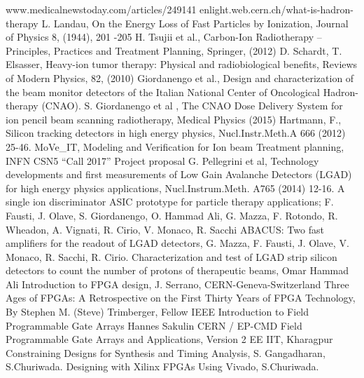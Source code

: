 \pagestyle{plain}
\begin{thebibliography}{00}	
	www.medicalnewstoday.com/articles/249141
	enlight.web.cern.ch/what-is-hadron-therapy
	L. Landau, On the Energy Loss of Fast Particles by Ionization, Journal of Physics 8, (1944), 201 -205
	H. Tsujii et al., Carbon-Ion Radiotherapy – Principles, Practices and Treatment Planning, Springer, (2012)
	D. Schardt, T. Elsasser, Heavy-ion tumor therapy: Physical and radiobiological benefits, Reviews of Modern Physics, 82, (2010)
	Giordanengo et al., Design and characterization of the beam monitor detectors of the Italian National Center of Oncological Hadron-therapy (CNAO).
	S. Giordanengo et al , The CNAO Dose Delivery System for ion pencil beam scanning radiotherapy, Medical Physics (2015)
	Hartmann, F., Silicon tracking detectors in high energy physics, Nucl.Instr.Meth.A 666 (2012) 25-46.
	MoVe\_IT, Modeling and Verification for Ion beam Treatment planning, INFN CSN5 “Call 2017” Project proposal
	G. Pellegrini et al, Technology developments and first measurements of Low Gain Avalanche Detectors (LGAD) for high energy physics applications, Nucl.Instrum.Meth. A765 (2014) 12-16.
	A single ion discriminator ASIC prototype for particle therapy applications; F. Fausti, J. Olave, S. Giordanengo, O. Hammad Ali, G. Mazza, F. Rotondo, R. Wheadon, A. Vignati, R. Cirio, V. Monaco, R. Sacchi
	ABACUS: Two fast amplifiers for the readout of LGAD detectors, G. Mazza, F. Fausti, J. Olave, V. Monaco, R. Sacchi, R. Cirio.
	Characterization and test of LGAD strip silicon detectors to count the number of protons of therapeutic beams, Omar Hammad Ali
	Introduction to FPGA design, J. Serrano, CERN-Geneva-Switzerland
	Three Ages of FPGAs: A Retrospective on the First Thirty Years of FPGA Technology, By Stephen M. (Steve) Trimberger, Fellow IEEE
	Introduction to Field Programmable Gate Arrays Hannes Sakulin CERN / EP-CMD
	Field Programmable Gate Arrays and Applications, Version 2 EE IIT, Kharagpur
	Constraining Designs for Synthesis and Timing Analysis, S. Gangadharan, S.Churiwada.
	Designing with Xilinx FPGAs Using Vivado, S.Churiwada.

\end{thebibliography}
